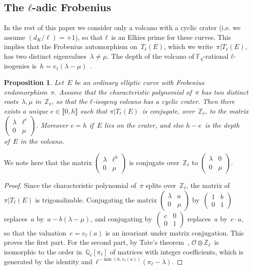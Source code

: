 \documentclass{lms}
\newtheorem{prop}[thm]{Proposition}
\newcommand{\F}{\mathbb{F}}
\begin{document}
\subsection{The $ℓ$-adic Frobenius}

In the rest of this paper we consider only a volcano with a cyclic
crater (i.e. we assume $(d_K/\ell) = +1$),
so that $ℓ$~is an Elkies prime for these curves.
This implies that the Frobenius automorphism on~$T_ℓ(E)$,
which we write~$π|T_ℓ(E)$, has two distinct eigenvalues~$λ ≠ μ$.
The depth of the volcano of $\F_q$-rational $ℓ$-isogenies
is~$h = v_ℓ(λ-μ)$~\cite[Theorem 7(iv)]{sutherland2013isogeny}.

\begin{prop}\label{prop:matrice-frobenius}
Let~$E$ be an ordinary elliptic curve with Frobenius endomorphism~$π$.
Assume that the characteristic polynomial of~$π$
has two distinct roots~$λ, μ$ in~$ℤ_ℓ$,
so that the $ℓ$-isogeny volcano has a cyclic crater.
Then there exists a unique $e ∈ \llbracket 0, h\rrbracket$
such that $π|T_ℓ(E)$~is conjugate, over~$ℤ_ℓ$,
to the matrix $\left ( \begin{smallmatrix}λ & ℓ^e \\ 0 & μ
\end{smallmatrix}\right )$.
Moreover $e = h$ if~$E$ lies on the crater,
and else $h - e$~is the depth of~$E$ in the volcano.
\end{prop}

We note here that the matrix $\left(\begin{smallmatrix} λ & ℓ^h \\ 0 &
μ \end{smallmatrix}\right)$ is conjugate over~$ℤ_ℓ$
to $\left(\begin{smallmatrix} λ & 0 \\ 0 & μ\end{smallmatrix}\right)$.
\begin{proof}
Since the characteristic polynomial of~$π$ splits over~$ℤ_ℓ$,
the matrix of~$π|T_ℓ(E)$ is trigonalizable.
Conjugating the matrix $\left ( \begin{smallmatrix}λ & a\\0 & μ
\end{smallmatrix}\right )$ by~$\left ( \begin{smallmatrix}1 & b\\0 & 1
\end{smallmatrix} \right )$ replaces~$a$ by~$a - b (λ - μ)$,
and conjugating by~$\left(\begin{smallmatrix} c & 0 \\ 0 &
1\end{smallmatrix}\right)$ replaces~$a$ by~$c · a$,
so that the valuation~$e = v_ℓ(a)$ is an invariant under matrix conjugation.
This proves the first part.
For the second part, by Tate's theorem~\cite[Isogeny theorem 7.7 (a)]{Sil},
$\mathcal O ⊗ ℤ_ℓ$~is isomorphic to the order in~$ℚ_ℓ[π_ℓ]$
of matrices with integer coefficients,
which is generated by the identity and~$ℓ^{-\min (h, v_ℓ(a))} (π_ℓ-λ)$.
\end{proof}
\end{document}
